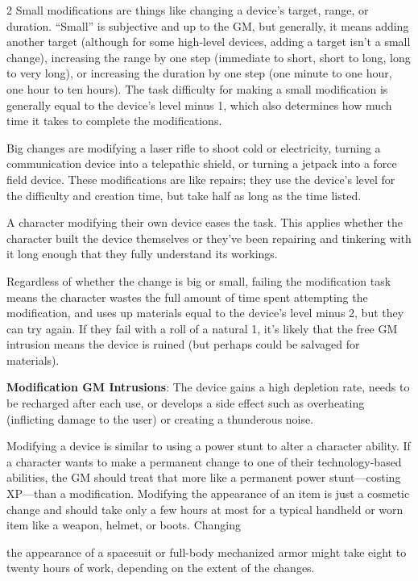 \begin{multicols}{2}
Small modifications are things like changing a device’s target, range, or duration. “Small” is subjective and up to the GM, but generally, it means adding another target (although for some high-level devices, adding a target isn’t a small change), increasing the range by one step (immediate to short, short to long, long to very long), or increasing the duration by one step (one minute to one hour, one hour to ten hours). The task difficulty for making a small modification is generally equal to the device’s level minus 1, which also determines how much time it takes to complete the modifications. 

Big changes are modifying a laser rifle to shoot cold or electricity, turning a communication device into a telepathic shield, or turning a jetpack into a force field device. These modifications are like repairs; they use the device’s level for the difficulty and creation time, but take half as long as the time listed. 

A character modifying their own device eases the task. This applies whether the character built the device themselves or they’ve been repairing and tinkering with it long enough that they fully understand its workings.

Regardless of whether the change is big or small, failing the modification task means the character wastes the full amount of time spent attempting the modification, and uses up materials equal to the device’s level minus 2, but they can try again. If they fail with a roll of a natural 1, it’s likely that the free GM intrusion means the device is ruined (but perhaps could be salvaged for materials).

\textbf{Modification GM Intrusions}: The device gains a high depletion rate, needs to be recharged after each use, or develops a side effect such as overheating (inflicting damage to the user) or creating a thunderous noise.

Modifying a device is similar to using a power stunt to alter a character ability. If a character wants to make a permanent change to one of their technology-based abilities, the GM should treat that more like a permanent power stunt—costing XP—than a modification.
Modifying the appearance of an item is just a cosmetic change and should take only a few hours at most for a typical handheld or worn item like a weapon, helmet, or boots. Changing

the appearance of a spacesuit or full-body mechanized armor might take eight to twenty hours of work, depending on the extent of the changes.


\end{multicols}
